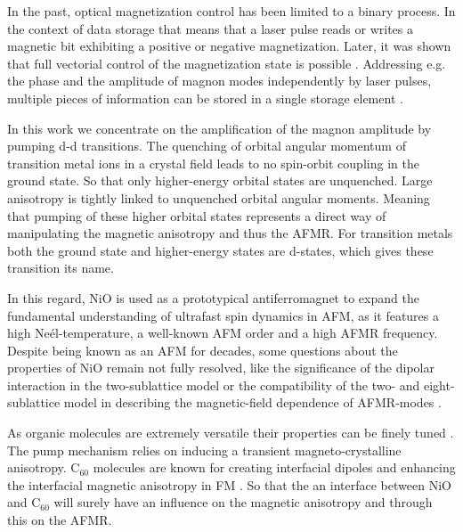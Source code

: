 In the past, optical magnetization control has been limited to a binary process.
In the context of data storage that means that a laser pulse reads or writes a magnetic bit exhibiting a positive or negative magnetization.
Later, it was shown that full vectorial control of the magnetization state is possible \cite{kanda_vectorial_2011, satoh_writing_2015}.
Addressing e.g. the phase and the amplitude of magnon modes independently by laser pulses, multiple pieces of information can be stored in a single storage element \cite{nemec_antiferromagnetic_2018}.

In this work we concentrate on the amplification of the magnon amplitude by pumping d-d transitions.
The quenching of orbital angular momentum of transition metal ions in a crystal field leads to no spin-orbit coupling in the ground state.
So that only higher-energy orbital states are unquenched.
Large anisotropy is tightly linked to unquenched orbital angular moments.
Meaning that pumping of these higher orbital states represents a direct way of manipulating the magnetic anisotropy and thus the AFMR.
For transition metals both the ground state and higher-energy states are d-states, which gives these transition its name.

In this regard, NiO is used as a prototypical antiferromagnet to expand the fundamental understanding of ultrafast spin dynamics in AFM, as it features a high Neél-temperature, a well-known AFM order and a high AFMR frequency.
Despite being known as an AFM for decades, some questions about the properties of NiO remain not fully resolved, like the significance of the dipolar interaction in the two-sublattice model or the compatibility of the two- and eight-sublattice model in describing the magnetic-field dependence of AFMR-modes \cite{ohmichi_frequency-domain_2022}.

As organic molecules are extremely versatile their properties can be finely tuned \cite{sanvito_molecular_2011}.
The pump mechanism relies on inducing a transient magneto-crystalline anisotropy.
C$_{60}$ molecules are known for creating interfacial dipoles  and enhancing the interfacial magnetic anisotropy in FM .
So that the an interface between NiO and C$_{60}$ will surely have an influence on the magnetic anisotropy and through this on the AFMR.

